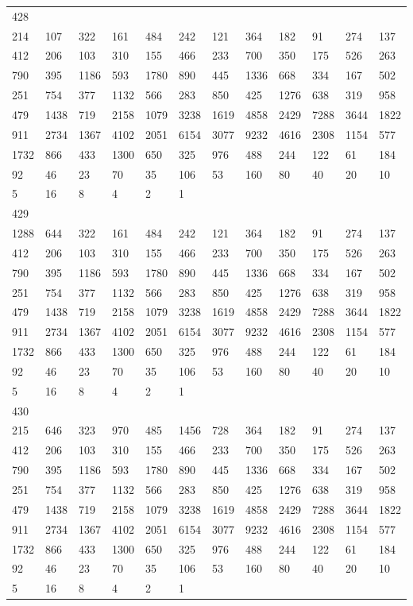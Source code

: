 \begin{longtable}{llllllllllll}
428&&&&&&&&&&&\\
214& 107& 322& 161& 484& 242& 121& 364& 182& 91& 274& 137\\
412& 206& 103& 310& 155& 466& 233& 700& 350& 175& 526& 263\\
790& 395& 1186& 593& 1780& 890& 445& 1336& 668& 334& 167& 502\\
251& 754& 377& 1132& 566& 283& 850& 425& 1276& 638& 319& 958\\
479& 1438& 719& 2158& 1079& 3238& 1619& 4858& 2429& 7288& 3644& 1822\\
911& 2734& 1367& 4102& 2051& 6154& 3077& 9232& 4616& 2308& 1154& 577\\
1732& 866& 433& 1300& 650& 325& 976& 488& 244& 122& 61& 184\\
92& 46& 23& 70& 35& 106& 53& 160& 80& 40& 20& 10\\
5& 16& 8& 4& 2& 1& \\

429&&&&&&&&&&&\\
1288& 644& 322& 161& 484& 242& 121& 364& 182& 91& 274& 137\\
412& 206& 103& 310& 155& 466& 233& 700& 350& 175& 526& 263\\
790& 395& 1186& 593& 1780& 890& 445& 1336& 668& 334& 167& 502\\
251& 754& 377& 1132& 566& 283& 850& 425& 1276& 638& 319& 958\\
479& 1438& 719& 2158& 1079& 3238& 1619& 4858& 2429& 7288& 3644& 1822\\
911& 2734& 1367& 4102& 2051& 6154& 3077& 9232& 4616& 2308& 1154& 577\\
1732& 866& 433& 1300& 650& 325& 976& 488& 244& 122& 61& 184\\
92& 46& 23& 70& 35& 106& 53& 160& 80& 40& 20& 10\\
5& 16& 8& 4& 2& 1& \\

430&&&&&&&&&&&\\
215& 646& 323& 970& 485& 1456& 728& 364& 182& 91& 274& 137\\
412& 206& 103& 310& 155& 466& 233& 700& 350& 175& 526& 263\\
790& 395& 1186& 593& 1780& 890& 445& 1336& 668& 334& 167& 502\\
251& 754& 377& 1132& 566& 283& 850& 425& 1276& 638& 319& 958\\
479& 1438& 719& 2158& 1079& 3238& 1619& 4858& 2429& 7288& 3644& 1822\\
911& 2734& 1367& 4102& 2051& 6154& 3077& 9232& 4616& 2308& 1154& 577\\
1732& 866& 433& 1300& 650& 325& 976& 488& 244& 122& 61& 184\\
92& 46& 23& 70& 35& 106& 53& 160& 80& 40& 20& 10\\
5& 16& 8& 4& 2& 1& \\


\end{longtable}
